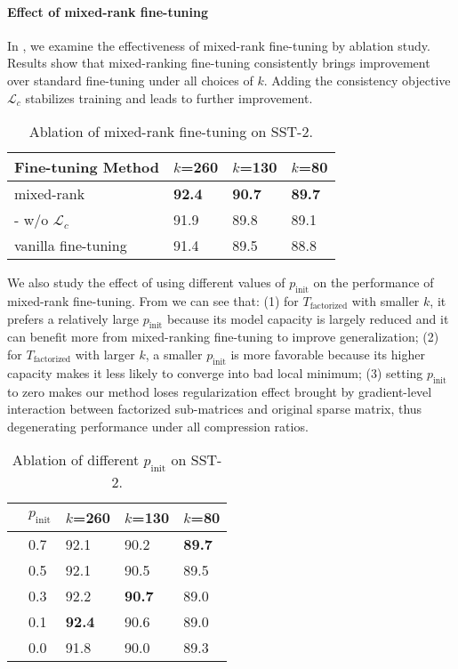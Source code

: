 \paragraph{Effect of mixed-rank fine-tuning} In , we examine the effectiveness of mixed-rank fine-tuning by ablation study.  Results show that mixed-ranking fine-tuning consistently brings improvement over standard fine-tuning under all choices of $k$. Adding the consistency objective $\mathcal{L}_{c}$  stabilizes training and leads to further improvement. 
\begin{table}[t]
	\centering
	\scriptsize
	\begin{tabular}{l|lll}
		\toprule
		Fine-tuning Method & $k$=260& $k$=130 & $k$=80   \\
		\midrule
		mixed-rank &\textbf{92.4}     & \textbf{90.7}   & \textbf{89.7}  \\
		- w/o $\mathcal{L}_{c}$  &91.9  &89.8   &89.1  \\
		\midrule
		vanilla fine-tuning &91.4 & 89.5   &88.8  	 \\
		\bottomrule
	\end{tabular}
	\caption{Ablation of mixed-rank fine-tuning on SST-2.}
	\label{table:wwomixedrank}
\end{table}

We also study the effect of using different values of $p_\text{init}$ on the performance of mixed-rank fine-tuning. From  we can see that: (1) for $T_\text{factorized}$ with smaller $k$, it prefers a relatively large $p_\text{init}$ because its model capacity is largely reduced and it can benefit more from mixed-ranking fine-tuning to improve generalization; (2) for $T_\text{factorized}$ with larger $k$, a smaller $p_\text{init}$ is more favorable because its higher capacity makes it less likely to converge into bad local minimum; (3) setting $p_\text{init}$ to zero makes our method loses regularization effect brought by gradient-level interaction between factorized sub-matrices and original sparse matrix, thus degenerating performance under all compression ratios.
\begin{table}[t]
	\centering
	\scriptsize
	\begin{tabular}{cl|lll}
		\toprule
		&$p_\text{init}$ & $k$=260     & $k$=130 & $k$=80   \\
		\midrule
		 & 0.7 & 92.1 & 90.2  & \textbf{89.7}  \\
		& 0.5& 92.1 & 90.5   & 89.5  \\
		& 0.3& 92.2 & \textbf{90.7}   & 89.0 \\
		& 0.1& \textbf{92.4} & 90.6   & 89.0 \\
		& 0.0  & 91.8   & 90.0   & 89.3 \\
		\bottomrule
	\end{tabular}
	\caption{Ablation of  different $p_\text{init}$ on SST-2.
	}
	\label{table:diffp}
\end{table}


